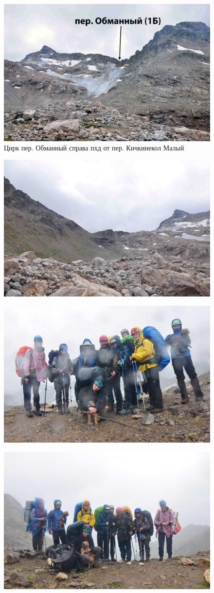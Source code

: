 \begin{figure}[h!]
	\centering
	\includegraphics[width=0.7\linewidth]{../pics/DSC_0227.JPG}
	\caption{Цирк пер. Обманный справа пхд от пер. Кичкинекол Малый}
	\label{fig:DSC_0227}
\end{figure}

\begin{figure}[h!]
	\centering
	\includegraphics[width=0.7\linewidth]{../pics/DSC_0230.JPG}
	\label{fig:DSC_0230}
\end{figure}

\begin{figure}[h!]
	\centering
	\includegraphics[angle=0, width=0.7\linewidth]{../pics/DSC_0239.JPG}
	\label{fig:DSC_0239}
\end{figure}

\begin{figure}[h!]
	\centering
	\includegraphics[angle=0, width=0.7\linewidth]{../pics/DSC_0242.JPG}
	\label{fig:DSC_0242}
\end{figure}

\clearpage